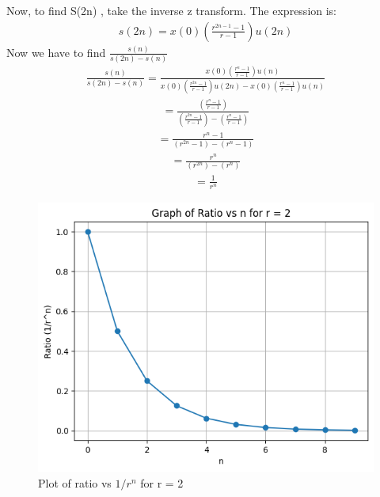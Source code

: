 \documentclass[journal,12pt,twocolumn]{IEEEtran}
\theoremstyle{remark}
\begin{document}
Now, to find S(2n) , take the inverse z transform. The expression is:
\begin{align}
s(2n) = x(0)\left(\frac{r^{2n-1}-1}{r-1}\right)u(2n)
\end{align}
Now we have to find $\frac{s(n)}{s(2n)-s(n)}$
\begin{align}
\frac{s(n)}{s(2n)-s(n)} = \frac{x(0)\left(\frac{r^{n}-1}{r-1}\right)u(n)}{x(0)\left(\frac{r^{2n}-1}{r-1}\right)u(2n)- x(0)\left(\frac{r^{n}-1}{r-1}\right)u(n)}
\end{align}
\begin{align}
 = \frac{\left(\frac{r^{n}-1}{r-1}\right)}{\left(\frac{r^{2n}-1}{r-1}\right)- \left(\frac{r^{n}-1}{r-1}\right)}
\end{align}
\begin{align}
= \frac{r^{n}-1}{(r^{2n}-1)- (r^{n}-1)}
\end{align}
\begin{align}
= \frac{r^{n}}{(r^{2n})- (r^{n})}
\end{align}
\begin{align}
= \frac{1}{r^{n}}
\end{align}
\begin{figure}[!ht]
\centering
\begin{center}
\includegraphics[width=\columnwidth]{figs/figure1}
\caption{Plot of ratio vs $1/r^n$ for r = 2}
\end{center}
\end{figure}
\end{document}
